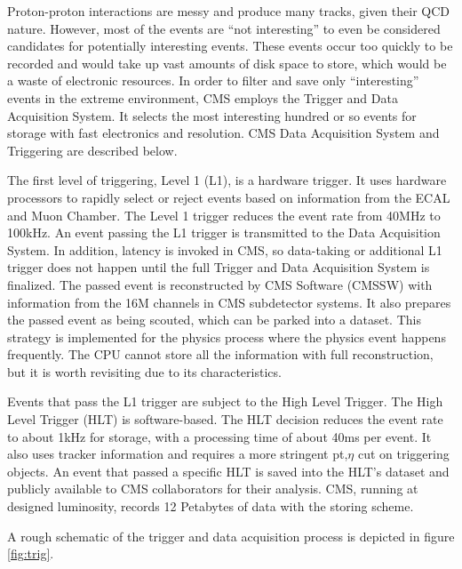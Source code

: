 Proton-proton interactions are messy and produce many tracks, given their QCD nature.
However, most of the events are ``not interesting'' to even be considered candidates for potentially interesting events.
These events occur too quickly to be recorded and would take up vast amounts of disk space to store, which would be a waste of electronic resources.
In order to filter and save only ``interesting'' events in the extreme environment, CMS employs the Trigger and Data Acquisition System.
It selects the most interesting hundred or so events for storage with fast electronics and resolution.
CMS Data Acquisition System and Triggering are described below.

The first level of triggering, Level 1 (L1), is a hardware trigger.
It uses hardware processors to rapidly select or reject events based on information from the ECAL and Muon Chamber.
The Level 1 trigger reduces the event rate from 40MHz to 100kHz.
An event passing the L1 trigger is transmitted to the Data Acquisition System.
In addition, latency is invoked in CMS, so data-taking or additional L1 trigger does not happen until the full Trigger and Data Acquisition System is finalized.
The passed event is reconstructed by CMS Software (CMSSW) with information from the 16M channels in CMS subdetector systems.
It also prepares the passed event as being scouted, which can be parked into a dataset.
This strategy is implemented for the physics process where the physics event happens frequently. The CPU cannot store all the information with full reconstruction, but it is worth revisiting due to its characteristics.


Events that pass the L1 trigger are subject to the High Level Trigger.
The High Level Trigger (HLT) is software-based.
The HLT decision reduces the event rate to about 1kHz for storage, with a processing time of about 40ms per event.
It also uses tracker information and requires a more stringent pt,$\eta$ cut on triggering objects.
An event that passed a specific HLT is saved into the HLT's dataset and publicly available to CMS collaborators for their analysis.
CMS, running at designed luminosity, records 12 Petabytes of data with the storing scheme.


A rough schematic of the trigger and data acquisition process is depicted in figure \ref{fig:trig}.
